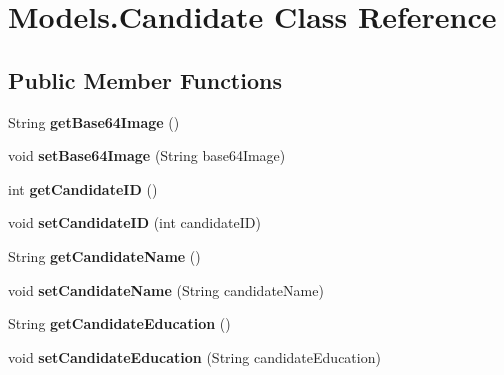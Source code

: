 \hypertarget{class_models_1_1_candidate}{}\section{Models.\+Candidate Class Reference}
\label{class_models_1_1_candidate}
\subsection*{Public Member Functions}
\begin{DoxyCompactItemize}
\item 
\mbox{\label{class_models_1_1_candidate_aee0292fee43617f198132bee44cb653f}} 
String {\bfseries get\+Base64\+Image} ()
\item 
\mbox{\label{class_models_1_1_candidate_a91c7f8bdb0eb5601fec5052e2a5c3f1f}} 
void {\bfseries set\+Base64\+Image} (String base64\+Image)
\item 
\mbox{\label{class_models_1_1_candidate_ac7d9d917ef7b78262d6a02f1bae37777}} 
int {\bfseries get\+Candidate\+ID} ()
\item 
\mbox{\label{class_models_1_1_candidate_a398e8a4e9a67b5e79e7a0fa30a2503f9}} 
void {\bfseries set\+Candidate\+ID} (int candidate\+ID)
\item 
\mbox{\label{class_models_1_1_candidate_a575d6293424c83a616c3b37227ffedd8}} 
String {\bfseries get\+Candidate\+Name} ()
\item 
\mbox{\label{class_models_1_1_candidate_a34d101b55e8c261ec4957379da1a4f4a}} 
void {\bfseries set\+Candidate\+Name} (String candidate\+Name)
\item 
\mbox{\label{class_models_1_1_candidate_ace777b32bce56961521cadf37c730feb}} 
String {\bfseries get\+Candidate\+Education} ()
\item 
\mbox{\label{class_models_1_1_candidate_a343a749f2f61b0a15a6b2c745a62159c}} 
void {\bfseries set\+Candidate\+Education} (String candidate\+Education)
\item 

\end{DoxyCompactItemize}
